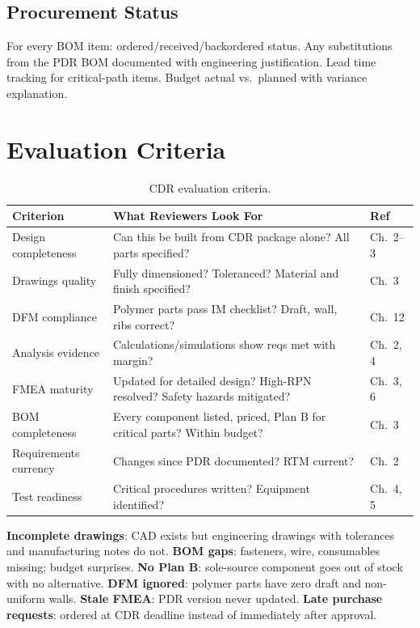 \documentclass[11pt,letterpaper,twoside,openany]{book}
\begin{document}
\subsection{Procurement Status}
For every BOM item: ordered/received/backordered status. Any substitutions from the PDR BOM documented with engineering justification. Lead time tracking for critical-path items. Budget actual vs.\ planned with variance explanation.


\section{Evaluation Criteria}

\begin{table}[htbp]\centering\small
\begin{tabularx}{\textwidth}{l X l}
\toprule
\textbf{Criterion} & \textbf{What Reviewers Look For} & \textbf{Ref} \\
\midrule
Design completeness & Can this be built from CDR package alone? All parts specified? & Ch.~2--3 \\
Drawings quality & Fully dimensioned? Toleranced? Material and finish specified? & Ch.~3 \\
DFM compliance & Polymer parts pass IM checklist? Draft, wall, ribs correct? & Ch.~12 \\
Analysis evidence & Calculations/simulations show reqs met with margin? & Ch.~2, 4 \\
FMEA maturity & Updated for detailed design? High-RPN resolved? Safety hazards mitigated? & Ch.~3, 6 \\
BOM completeness & Every component listed, priced, Plan B for critical parts? Within budget? & Ch.~3 \\
Requirements currency & Changes since PDR documented? RTM current? & Ch.~2 \\
Test readiness & Critical procedures written? Equipment identified? & Ch.~4, 5 \\
\bottomrule
\end{tabularx}
\caption{CDR evaluation criteria.}
\end{table}

\begin{tipbox}
\textbf{Incomplete drawings}: CAD exists but engineering drawings with tolerances and manufacturing notes do not. \textbf{BOM gaps}: fasteners, wire, consumables missing; budget surprises. \textbf{No Plan B}: sole-source component goes out of stock with no alternative. \textbf{DFM ignored}: polymer parts have zero draft and non-uniform walls. \textbf{Stale FMEA}: PDR version never updated. \textbf{Late purchase requests}: ordered at CDR deadline instead of immediately after approval.
\end{tipbox}
\end{document}
